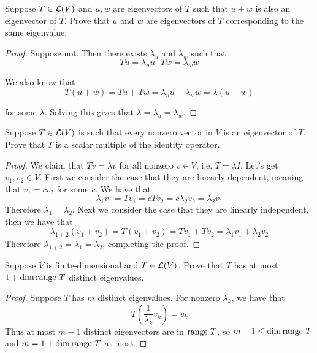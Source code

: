 \documentclass{extarticle}
\begin{document}
\begin{problem}{25}
    Suppose \(T \in \mathcal{L}(V)\) and \(u, w\) are eigenvectors of \(T\) such that 
    \(u + w\) is also an eigenvector of \(T\). Prove that \(u\) and \(w\) are eigenvectors 
    of \(T\) corresponding to the same eigenvalue.  
\end{problem}


\begin{proof}
Suppose not. Then there exists \(\lambda_u\) and \(\lambda_w\) such that 
\[Tu = \lambda_u u \ \ \ Tw = \lambda_w w\]

We also know that 
\[T(u+w) = Tu + Tw = \lambda_u u + \lambda_w w = \lambda(u + w)\]

for some \(\lambda\). Solving this gives that \(\lambda = \lambda_u = \lambda_w\).

\end{proof}


\begin{problem}{26}
    Suppose \(T \in \mathcal{L}(V)\) is such that every nonzero vector in \(V\) is an eigenvector of 
    \(T\). Prove that \(T\) is a scalar multiple of the identity operator. 
\end{problem}

\begin{proof}
We claim that \(Tv = \lambda v\) for all nonzero \(v \in V\), i.e. \(T = \lambda I\). Let's 
get \(v_1, v_2 \in V\). First we consider the case that they are linearly dependent, meaning 
that \(v_1 = c v_2\) for some \(c\). We have that 
\[\lambda_1 v_1 = Tv_1 = c Tv_2 = c \lambda_2 v_2 = \lambda_2 v_1\]
Therefore \(\lambda_1 = \lambda_2\). Next we consider the case that they are linearly independent, 
then we have that 
\[ \lambda_{1+2} (v_1 + v_2) = T (v_1 + v_2) = Tv_1 + Tv_2 = \lambda_1 v_1 + \lambda_2 v_2 \]
Therefore \(\lambda_{1+2} = \lambda_1  = \lambda_2\), completing the proof. 
\end{proof}


\begin{problem}{28}
    Suppose \(V\) is finite-dimensional and \(T \in \mathcal{L}(V)\). Prove that \(T\) has at most 
    \(1 + \dim \text{range } T\) distinct eigenvalues. 
\end{problem}


\begin{proof}
Suppose \(T\) has \(m\) distinct eigenvalues. For nonzero \(\lambda_k\), we have that 
\[T(\frac{1}{\lambda_k} v_k) = v_k\]
Thus at most \(m-1\) distinct eigenvectors are in \(\text{range } T\), so \(m - 1 \leq \dim \text{range } T\)
and \(m = 1 + \dim \text{range } T\) at most. 
\end{proof}
\end{document}
